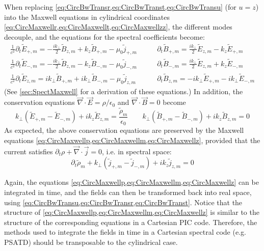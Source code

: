 \documentclass[a4paper]{article}   	%
\begin{document}
When replacing \cref{eq:CircBwTransr,eq:CircBwTranst,eq:CircBwTransu}
(for $u=z$) into the Maxwell equations in cylindrical
coordinates \cref{eq:CircMaxwellr,eq:CircMaxwellt,eq:CircMaxwellzz},
the different modes decouple, and the equations for the spectral
coefficients become:
\begin{align}
\frac{1}{c^2}\partial_t \tilde{E}_{+,m} = - \frac{ik_\perp }{2}\tilde{B}_{z,m} + k_z\tilde{B}_{+,m} - \mu_0\tilde{j}_{+,m} \qquad &   
\partial_t \tilde{B}_{+,m} = \frac{ik_\perp }{2} \tilde{E}_{z,m} - k_z
\tilde{E}_{+,m} 
\label{eq:CircMaxwellp} \\
\frac{1}{c^2}\partial_t \tilde{E}_{-,m} = -\frac{ik_\perp }{2} \tilde{B}_{z,m} - k_z \tilde{B}_{-,m} - \mu_0  \tilde{j}_{-,m} \qquad &   
\partial_t \tilde{B}_{-,m} = \frac{ik_\perp }{2} \tilde{E}_{z,m} + k_z
\tilde{E}_{-,m} \label{eq:CircMaxwellm} \\
\frac{1}{c^2}\partial_t \tilde{E}_{z,m} = ik_\perp  \tilde{B}_{+,m} + ik_\perp \tilde{B}_{-,m}  - \mu_0 \tilde{j}_{z,m}  \qquad & 
\partial_t \tilde{B}_{z,m} = -ik_\perp  \tilde{E}_{+,m} - ik_\perp \tilde{E}_{-,m}  \label{eq:CircMaxwellz} 
\end{align}
(See \cref{sec:SpectMaxwell} for a derivation of these equations.) In
addition, the conservation equations
$\vec{\nabla}\cdot\vec{E}=\rho/\epsilon_0$ and
$\vec{\nabla}\cdot\vec{B} = 0$
become
\begin{equation}
\label{eq:SpectCons}
k_\perp (\tilde{E}_{+,m} -\tilde{E}_{-,m}) + ik_z \tilde{E}_{z,m} =
\frac{\tilde{\rho}_m}{\epsilon_0} \qquad
 k_\perp (\tilde{B}_{+,m} -\tilde{B}_{-,m}) + ik_z \tilde{B}_{z,m} =
0 \end{equation}
As expected, the above conservation equations are
preserved by the Maxwell equations
\cref{eq:CircMaxwellp,eq:CircMaxwellm,eq:CircMaxwellz}, provided
that the current satisfies $\partial_t
\rho + \vec{\nabla} \cdot \vec{j} = 0$, i.e. in spectral space:
\begin{equation}
\label{eq:SpectCharge}
\partial_t \tilde{\rho}_m + k_\perp (\tilde{j}_{+,m} -\tilde{j}_{-,m}) + ik_z
\tilde{j}_{z,m} = 0
\end{equation}  

Again, the equations \cref{eq:CircMaxwellp,eq:CircMaxwellm,eq:CircMaxwellz}  can be
integrated in time, and the fields can then be transformed back into
real space, using \cref{eq:CircBwTransu,eq:CircBwTransr,eq:CircBwTranst}. Notice that
the structure of \cref{eq:CircMaxwellp,eq:CircMaxwellm,eq:CircMaxwellz} is similar to
the structure of the corresponding equations in a Cartesian PIC code. Therefore,
the methods used to integrate the fields in time in a Cartesian
spectral code (e.g. PSATD) should be transposable to the cylindrical case.
\end{document}
